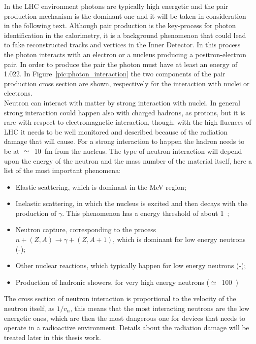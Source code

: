 In the LHC environment photons are typically high energetic and the pair production mechanism is the dominant one and it will be taken in consideration in the following text.
Although pair production is the key-process for photon identification in the calorimetry, it is a background phenomenon that could lead to fake reconstructed tracks and vertices in the Inner Detector.
In this process the photon interacts with an electron or a nucleus producing a positron-electron pair. In order to produce the pair the photon must have at least an energy of 1.022\MeV. In Figure~\ref{pic:photon_interaction} the two components of the pair production cross section are shown, respectively for the interaction with nuclei or electrons.\\
Neutron can interact with matter by strong interaction with nuclei. In general strong interaction could happen also with charged hadrons, as protons, but it is rare with respect to electromagnetic interaction, though, with the high fluences of LHC it needs to be well monitored and described because of the radiation damage that will cause.
For a strong interaction to happen the hadron needs to be at $\simeq$~\SI{10}{fm} from the nucleus. The type of neutron interaction will depend upon the energy of the neutron and the mass number of the material itself, here a list of the most important phenomena:
\begin{itemize}
\item Elastic scattering, which is dominant in the MeV region;
\item Inelastic scattering, in which the nucleus is excited and then decays with the production of $\gamma$. This phenomenon has a energy threshold of about 1~\MeV;
\item Neutron capture, corresponding to the process $n+(Z,A)\rightarrow \gamma + (Z,A+1)$, which is dominant for low energy neutrons (\eV-\keV);
\item Other nuclear reactions, which typically happen for low energy neutrons (\eV -\keV);
\item Production of hadronic showers, for very high energy neutrons ($\simeq$~100~\MeV)
\end{itemize}
The cross section of neutron interaction is proportional to the velocity of the neutron itself, as $1/v_n$, this means that the most interacting neutrons are the low energetic ones, which are then the most dangerous one for devices that needs to operate in a radioactive environment. Details about the radiation damage will be treated later in this thesis work.
